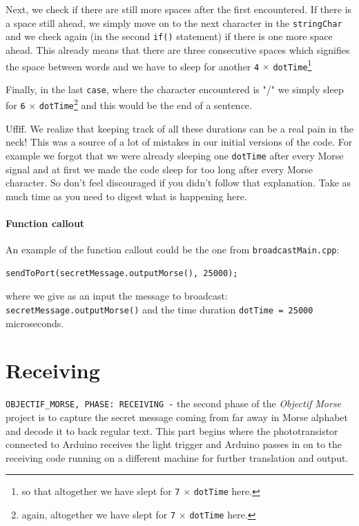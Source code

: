 \documentclass[10pt]{report}
\begin{document}
Next, we check if there are still more spaces after the first encountered. If there is a space still ahead, we simply move on to the next character in the \texttt{stringChar} and we check again (in the second \texttt{if()} statement) if there is one more space ahead. This already means that there are three consecutive spaces which signifies the space between words and we have to sleep for another \verb|4| $\times$ \verb|dotTime|\footnote{so that altogether we have slept for \texttt{7} $\times$ \texttt{dotTime} here.}

Finally, in the last \texttt{case}, where the character encountered is "/" we simply sleep for \verb|6| $\times$ \verb|dotTime|\footnote{again, altogether we have slept for \texttt{7} $\times$ \texttt{dotTime} here.} and this would be the end of a sentence.

Uffff. We realize that keeping track of all these durations can be a real pain in the neck! This was a source of a lot of mistakes in our initial versions of the code. For example we forgot that we were already sleeping one \verb|dotTime| after every Morse signal and at first we made the code sleep for too long after every Morse character. So don't feel discouraged if you didn't follow that explanation. Take as much time as you need to digest what is happening here.

\subsubsection{Function callout}

An example of the function callout could be the one from \texttt{broadcastMain.cpp}:

\begin{lstlisting}
sendToPort(secretMessage.outputMorse(), 25000);
\end{lstlisting}

where we give as an input the message to broadcast: \texttt{secretMessage.outputMorse()} and the time duration \texttt{dotTime = 25000} microseconds.

\newpage

\chapter{Receiving}


\verb|OBJECTIF_MORSE, PHASE: RECEIVING -| the second phase of the \textit{Objectif Morse} project is to capture the secret message coming from far away in Morse alphabet and decode it to back regular text. This part begins where the phototransistor connected to Arduino receives the light trigger and Arduino passes in on to the receiving code running on a different machine for further translation and output.
\end{document}
